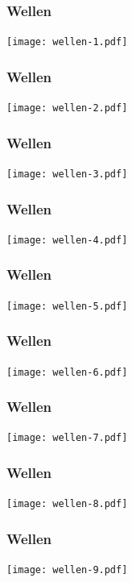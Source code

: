 \begin{frame}
\frametitle{Wellen}
\begin{center}
\texttt{[image: wellen-1.pdf]}
\end{center}
\end{frame}

\begin{frame}
\frametitle{Wellen}
\begin{center}
\texttt{[image: wellen-2.pdf]}
\end{center}
\end{frame}

\begin{frame}
\frametitle{Wellen}
\begin{center}
\texttt{[image: wellen-3.pdf]}
\end{center}
\end{frame}

\begin{frame}
\frametitle{Wellen}
\begin{center}
\texttt{[image: wellen-4.pdf]}
\end{center}
\end{frame}

\begin{frame}
\frametitle{Wellen}
\begin{center}
\texttt{[image: wellen-5.pdf]}
\end{center}
\end{frame}

\begin{frame}
\frametitle{Wellen}
\begin{center}
\texttt{[image: wellen-6.pdf]}
\end{center}
\end{frame}

\begin{frame}
\frametitle{Wellen}
\begin{center}
\texttt{[image: wellen-7.pdf]}
\end{center}
\end{frame}

\begin{frame}
\frametitle{Wellen}
\begin{center}
\texttt{[image: wellen-8.pdf]}
\end{center}
\end{frame}

\begin{frame}
\frametitle{Wellen}
\begin{center}
\texttt{[image: wellen-9.pdf]}
\end{center}
\end{frame}

